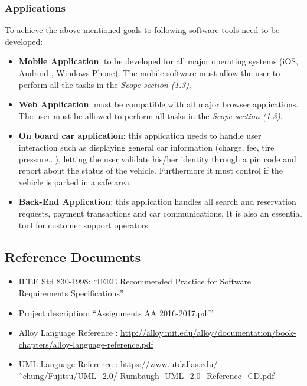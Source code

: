 \documentclass[12pt]{article}
\begin{document}
	
	\subsubsection{Applications}
		To achieve the above mentioned goals to following software tools need to be developed:
	
	\begin{itemize}
		\item \textbf{Mobile Application}: to be developed for all major operating systems 
					 (iOS, Android , Windows Phone). The mobile software must allow the user 
					 to perform all the tasks in the \hyperref[scope:1]{\textit{Scope section 
					 (1.3)}}.
		\item \textbf{Web Application}: must be compatible with all major browser applications. 
					 The user must be allowed to perform all tasks in  the \hyperref[scope:1]
					 {\textit{Scope section (1.3)}}.
		\item \textbf{ On board car application}: this application needs to handle user 
					 interaction such as displaying general car information (charge, fee, tire 
					 pressure...), letting the user validate his/her identity through a pin 
					 code and report about the status of the vehicle. 
					 Furthermore it must control if the vehicle is parked in a safe area.
		\item \textbf{ Back-End Application}: this application handles all search and 
					 reservation requests, payment transactions and car communications. It is
					 also an essential tool for customer support operators.
	\end{itemize}
		
	\subsection{Reference Documents}
	\begin{itemize}
		\item IEEE Std 830-1998: “IEEE Recommended Practice for Software Requirements 	
			  Specifications”
	 	\item Project description: “Assignments AA 2016-2017.pdf”
	 	\item Alloy Language Reference : \url{http://alloy.mit.edu/alloy/documentation/book-	
	 		  chapters/alloy-language-reference.pdf}
	 	\item UML Language Reference : \url{https://www.utdallas.edu/˜chung/Fujitsu/UML_2.0/
	 		  Rumbaugh--UML_2.0_Reference_CD.pdf}
	\end{itemize}
	
\end{document}
